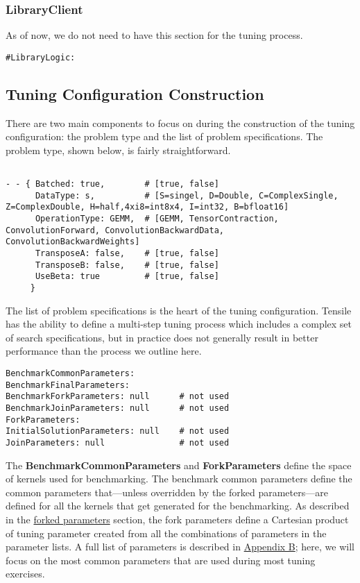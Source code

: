 \documentclass[]{article}
\begin{document}
\subsubsection{LibraryClient}
\label{sec:LibClient}

\noindent
As of now, we do not need to have this section for the tuning process.

\begin{verbatim}
#LibraryLogic:
\end{verbatim}


\subsection{Tuning Configuration Construction}

There are two main components to focus on during the construction of the tuning configuration: the problem type and the list of problem specifications. The problem type, shown below, is fairly straightforward.

\begin{verbatim}

- - { Batched: true,        # [true, false]
      DataType: s,          # [S=singel, D=Double, C=ComplexSingle, Z=ComplexDouble, H=half,4xi8=int8x4, I=int32, B=bfloat16]
      OperationType: GEMM,  # [GEMM, TensorContraction, ConvolutionForward, ConvolutionBackwardData, ConvolutionBackwardWeights]
      TransposeA: false,    # [true, false]
      TransposeB: false,    # [true, false]
      UseBeta: true         # [true, false]
     }

\end{verbatim}

The list of problem specifications is the heart of the tuning configuration. Tensile has the ability to define a multi-step tuning process which includes a complex set of search specifications, but in practice does not generally result in better performance than the process we outline here.
\begin{verbatim}
BenchmarkCommonParameters:
BenchmarkFinalParameters:
BenchmarkForkParameters: null      # not used
BenchmarkJoinParameters: null      # not used
ForkParameters:
InitialSolutionParameters: null    # not used
JoinParameters: null               # not used
\end{verbatim}

The  {\color{ForestGreen} \bf BenchmarkCommonParameters} and  {\color{ForestGreen} \bf ForkParameters} define the space of kernels used for benchmarking. The benchmark common parameters define the common parameters that---unless overridden by the forked parameters---are defined for all the kernels that get generated for the benchmarking. As described in the \hyperref[sec:forkParams]{forked parameters} section, the fork parameters define a Cartesian product of tuning parameter created from all the combinations of parameters in the parameter lists. A full list of parameters is described in \hyperref[sec:appendixB]{Appendix B}; here, we will focus on the most common parameters that are used during most tuning exercises.
\end{document}
